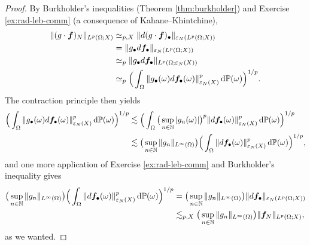 \begin{proof}
  By Burkholder's inequalities (Theorem \ref{thm:burkholder}) and Exercise \ref{ex:rad-leb-comm} (a consequence of Kahane--Khintchine), 
  \begin{equation*}
    \begin{aligned}
      \|(g \cdot \bm{f})_{N}\|_{L^p(\Omega;X)}
      &\simeq_{p,X} \|d(g \cdot \bm{f})_{\bullet}\|_{\varepsilon_{N}(L^p(\Omega;X))} \\
      &= \|g_{\bullet} d\bm{f}_{\bullet}\|_{\varepsilon_{N}(L^p(\Omega;X))} \\
      &\simeq_{p} \|g_{\bullet} d\bm{f}_{\bullet}\|_{L^p(\Omega;\varepsilon_{N}(X))} \\
      &\simeq_{p} \Big( \int_{\Omega} \|g_{\bullet}(\omega) d\bm{f}_{\bullet}(\omega)\|_{\varepsilon_{N}(X)}^{p} \, \mathrm{d}\mathbb{P}(\omega) \Big)^{1/p}.
    \end{aligned}
  \end{equation*}
  The contraction principle then yields
  \begin{equation*}
    \begin{aligned}
    \Big( \int_{\Omega} \|g_{\bullet}(\omega) d\bm{f}_{\bullet}(\omega)\|_{\varepsilon_{N}(X)}^{p} \, \mathrm{d}\mathbb{P}(\omega) \Big)^{1/p}
    &\lesssim \Big( \int_{\Omega} \big( \sup_{n \in \mathbb{N}} |g_{n}(\omega)| \big)^{p} \|d\bm{f}_{\bullet}(\omega)\|_{\varepsilon_{N}(X)}^{p} \, \mathrm{d}\mathbb{P}(\omega) \Big)^{1/p} \\
    &\lesssim \big( \sup_{n \in \mathbb{N}} \|g_{n}\|_{L^\infty(\Omega)} \big)  \Big( \int_{\Omega} \|d\bm{f}_{\bullet}(\omega)\|_{\varepsilon_{N}(X)}^{p} \, \mathrm{d}\mathbb{P}(\omega) \Big)^{1/p},
  \end{aligned}
\end{equation*}
and one more application of Exercise \ref{ex:rad-leb-comm} and Burkholder's inequality gives
\begin{equation*}
  \begin{aligned}
    \big( \sup_{n \in \mathbb{N}} \|g_{n}\|_{L^\infty(\Omega)} \big)  \Big( \int_{\Omega} \|d\bm{f}_{\bullet}(\omega)\|_{\varepsilon_{N}(X)}^{p} \, \mathrm{d}\mathbb{P}(\omega) \Big)^{1/p}
    &= \big( \sup_{n \in \mathbb{N}} \|g_{n}\|_{L^\infty(\Omega)} \big) \|d\bm{f}_{\bullet}\|_{\varepsilon_{N}(L^p(\Omega;X))} \\
    &\lesssim_{p,X} \big( \sup_{n \in \mathbb{N}} \|g_{n}\|_{L^\infty(\Omega)} \big) \|\bm{f}_{N}\|_{L^p(\Omega;X)},
  \end{aligned}
\end{equation*}
as we wanted.
\end{proof}

